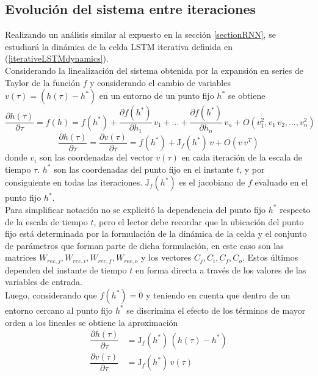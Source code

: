 \documentclass{article}
\begin{document}
	\subsection{Evolución del sistema entre iteraciones}
	Realizando un análisis similar al expuesto en la sección \ref{sectionRNN}, se estudiará la dinámica de la celda LSTM iterativa definida en (\ref{iterativeLSTMdynamics}).\\
	Considerando la linealización del sistema obtenida por la expansión en series de Taylor de la función $f$ y considerando el cambio de variables $v(\tau) = (h(\tau) - h^*)$ en un entorno de un punto fijo $h^*$ se obtiene
	\begin{equation*}
	\dfrac{\partial h(\tau)}{\partial \tau} = f(h) = f(h^*) + \dfrac{\partial f(h^*)}{\partial h_1} \, v_1+ ... + \dfrac{\partial f(h^*)}{\partial h_n} \, v_n + O(v_1^2, v_1 \, v_2, ... , v_n^2)
	\end{equation*}
	\begin{equation*}
	\dfrac{\partial h(\tau)}{\partial \tau} = \dfrac{\partial v(\tau)}{\partial \tau} = f(h^*) + \mathrm{J}_f(h^*) \, v + O(v \, v^T)
	\end{equation*}
	donde $v_i$ son las coordenadas del vector $v(\tau)$ en cada iteración de la escala de tiempo $\tau$. $h^*$ son las coordenadas del punto fijo en el instante $t$, y por consiguiente en todas las iteraciones. $\mathrm{J}_f(h^*)$ es el jacobiano de $f$ evaluado en el punto fijo $h^*$. \\
	Para simplificar notación no se explicitó la dependencia del punto fijo $h^*$ respecto de la escala de tiempo $t$, pero el lector debe recordar que la ubicación del punto fijo está determinada por la formulación de la dinámica de la celda y el conjunto de parámetros que forman parte de dicha formulación, en este caso son las matrices  $W_{rec, j}, W_{rec, i}, W_{rec, f}, W_{rec, o}$ y los vectores $C_j, C_i, C_f, C_o$. Estos últimos dependen del instante de tiempo $t$ en forma directa a través de los valores de las variables de entrada.\\
	
	Luego, considerando que $f(h^*) = 0$ y teniendo en cuenta que dentro de un entorno cercano al punto fijo $h^*$ se discrimina el efecto de los términos de mayor orden a los lineales se obtiene la aproximación
	\begin{equation}\label{linearDynamics}
	\begin{split}
	\dfrac{\partial h(\tau)}{\partial \tau} &= \mathrm{J}_f(h^*) \, (h(\tau) - h^*)\\
	\dfrac{\partial v(\tau)}{\partial \tau} &= \mathrm{J}_f(h^*) \,v(\tau) 
	\end{split}
	\end{equation}
	
\end{document}
